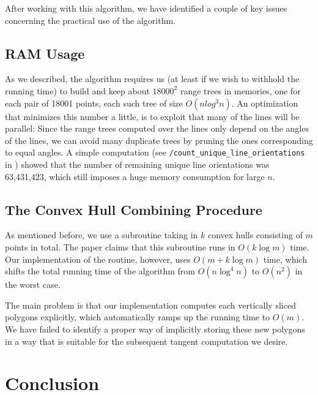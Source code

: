 \documentclass{article}
\begin{document}
After working with this algorithm, we have identified a couple of key issues concerning the practical use of the algorithm.

\subsection{RAM Usage}

As we described, the algorithm requires us (at least if we wish to withhold the running time) to build and keep about $18000^2$ range trees in memories, one for each pair of 18001 points, each such tree of size $O(n log^3 n)$. An optimization that minimizes this number a little, is to exploit that many of the lines will be parallel: Since the range trees computed over the lines only depend on the angles of the lines, we can avoid many duplicate trees by pruning the ones corresponding to equal angles. A simple computation (see \texttt{/count\_unique\_line\_orientations} in \cite{hm18}) showed that the number of remaining unique line orientations was 63,431,423, which still imposes a huge memory consumption for large $n$.

\subsection{The Convex Hull Combining Procedure}

As mentioned before, we use a subroutine taking in $k$ convex hulls consisting of $m$ points in total. The paper claims that this subroutine runs in $O(k \log m)$ time. Our implementation of the routine, however, uses $O(m + k\log m)$ time, which shifts the total running time of the algorithm from $O(n \log^4 n)$ to $O(n^2)$ in the worst case.

The main problem is that our implementation computes each vertically sliced polygons explicitly, which automatically ramps up the running time to $O(m)$. We have failed to identify a proper way of implicitly storing these new polygons in a way that is suitable for the subsequent tangent computation we desire. 

\section{Conclusion}



\end{document}
